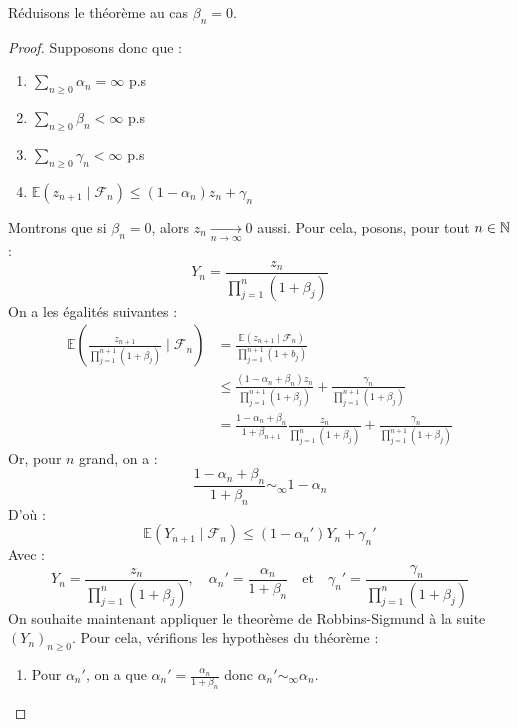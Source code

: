 \begin{lemma}
    Réduisons le théorème au cas $ \beta_n = 0$.
\end{lemma}

\begin{proof}
    Supposons donc que : 
    \begin{enumerate}[label=\roman*]
        \item $ \sum_{n \geqslant 0} \alpha_n = \infty $ p.s
        \item $ \sum_{n \geqslant 0} \beta_n < \infty $ p.s 
        \item $ \sum_{n \geqslant 0} \gamma_n < \infty $ p.s
        \item $ \mathbb{E}(z_{n+1} \mid \mathcal{F}_n) \leqslant (1 - \alpha_n) z_n + \gamma_n$
    \end{enumerate}
    Montrons que si $ \beta_n = 0$, alors $ z_n \underset{n \to \infty}{\longrightarrow} 0$ aussi.
    Pour cela, posons, pour tout $n \in \mathbb{N}$ : 
        $$ Y_n = \frac{z_n}{ \prod_{j=1}^n (1 + \beta_j)} $$ 
    On a les égalités suivantes : 
        \begin{align*}
            \mathbb{E} \left( \frac{z_{n+1}}{ \prod_{j=1}^{n+1} (1 + \beta_j)} \mid \mathcal{F}_n\right) &= \frac{ \mathbb{E}(z_{n+1} \mid \mathcal{F}_n)}{\prod_{j=1}^{n+1} (1 + b_j)} \\ 
            & \leqslant \frac{ (1 - \alpha_n + \beta_n) z_n}{ \prod_{j=1}^{n+1} (1 + \beta_j)} + \frac{ \gamma_n}{ \prod_{j=1}^{n+1} (1 + \beta_j)} \\
            &= \frac{1 - \alpha_n + \beta_n}{1 + \beta_{n+1}} \frac{z_n}{\prod_{j=1}^{n} (1 + \beta_j)} + \frac{ \gamma_n}{ \prod_{j=1}^{n+1} (1 + \beta_j)}
        \end{align*}
    Or, pour $n$ grand, on a : 
        $$ \frac{1 - \alpha_n + \beta_n}{1 + \beta_n} \sim_\infty 1 - \alpha_n $$ 
    D'où : 
        $$ \mathbb{E} \left( Y_{n+1} \mid \mathcal{F}_n\right) \leqslant (1 - \alpha_n') Y_n + \gamma_n' $$ 
    Avec : 
        $$ Y_{n} = \frac{z_n}{ \prod_{j=1}^{n} (1 + \beta_j)}, \quad \alpha_n' = \frac{ \alpha_n}{1 + \beta_n} \quad \text{et} \quad \gamma_n' = \frac{ \gamma_n}{\prod_{j=1}^{n} (1 + \beta_j)} $$
    On souhaite maintenant appliquer le theorème de Robbins-Sigmund à la suite $(Y_n)_{n \geqslant 0}$. Pour cela, vérifions 
    les hypothèses du théorème : 
    \begin{enumerate}[label=\roman*]
        \item Pour $ \alpha_n'$, on a que $ \alpha_n' = \frac{ \alpha_n}{1 + \beta_n} $ donc $ \alpha_n' \sim_\infty \alpha_n$. 

\end{enumerate}
\end{proof}
